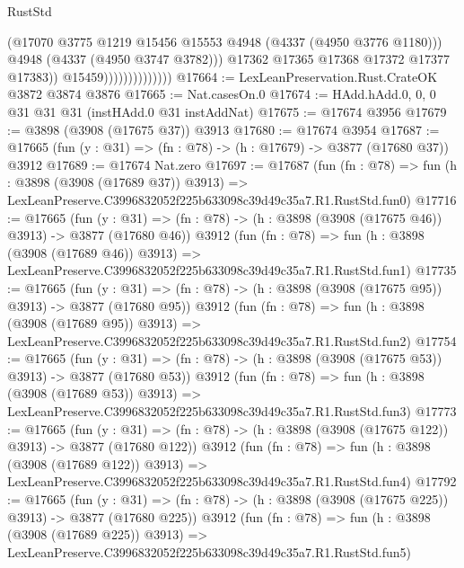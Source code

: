 \begin{lexlean}{RustStd}
\begin{coremodule}
                                      (@17070
                                        @3775
                                        @1219
                                        @15456
                                        @15553
                                        @4948
                                        (@4337 (@4950 @3776 @1180)))
                                      @4948
                                      (@4337 (@4950 @3747 @3782)))
                                    @17362
                                    @17365
                                    @17368
                                    @17372
                                    @17377
                                    @17383))
                                @15459))))))))))))))
@17664 := LexLeanPreservation.Rust.CrateOK @3872 @3874 @3876
@17665 := Nat.casesOn.{0}
@17674 := HAdd.hAdd.{0, 0, 0} @31 @31 @31 (instHAdd.{0} @31 instAddNat)
@17675 := @17674 @3956
@17679 := @3898 (@3908 (@17675 @37)) @3913
@17680 := @17674 @3954
@17687 := @17665 (fun (y : @31) => (fn : @78) -> (h : @17679) -> @3877 (@17680 @37)) @3912
@17689 := @17674 Nat.zero
@17697 := @17687
    (fun (fn : @78) =>
    fun (h : @3898 (@3908 (@17689 @37)) @3913) =>
    LexLeanPreserve.C3996832052f225b633098c39d49c35a7.R1.RustStd.fun0)
@17716 := @17665
    (fun (y : @31) => (fn : @78) -> (h : @3898 (@3908 (@17675 @46)) @3913) -> @3877 (@17680 @46))
    @3912
    (fun (fn : @78) =>
    fun (h : @3898 (@3908 (@17689 @46)) @3913) =>
    LexLeanPreserve.C3996832052f225b633098c39d49c35a7.R1.RustStd.fun1)
@17735 := @17665
    (fun (y : @31) => (fn : @78) -> (h : @3898 (@3908 (@17675 @95)) @3913) -> @3877 (@17680 @95))
    @3912
    (fun (fn : @78) =>
    fun (h : @3898 (@3908 (@17689 @95)) @3913) =>
    LexLeanPreserve.C3996832052f225b633098c39d49c35a7.R1.RustStd.fun2)
@17754 := @17665
    (fun (y : @31) => (fn : @78) -> (h : @3898 (@3908 (@17675 @53)) @3913) -> @3877 (@17680 @53))
    @3912
    (fun (fn : @78) =>
    fun (h : @3898 (@3908 (@17689 @53)) @3913) =>
    LexLeanPreserve.C3996832052f225b633098c39d49c35a7.R1.RustStd.fun3)
@17773 := @17665
    (fun (y : @31) => (fn : @78) -> (h : @3898 (@3908 (@17675 @122)) @3913) -> @3877 (@17680 @122))
    @3912
    (fun (fn : @78) =>
    fun (h : @3898 (@3908 (@17689 @122)) @3913) =>
    LexLeanPreserve.C3996832052f225b633098c39d49c35a7.R1.RustStd.fun4)
@17792 := @17665
    (fun (y : @31) => (fn : @78) -> (h : @3898 (@3908 (@17675 @225)) @3913) -> @3877 (@17680 @225))
    @3912
    (fun (fn : @78) =>
    fun (h : @3898 (@3908 (@17689 @225)) @3913) =>
    LexLeanPreserve.C3996832052f225b633098c39d49c35a7.R1.RustStd.fun5)

\end{coremodule}
\end{lexlean}

